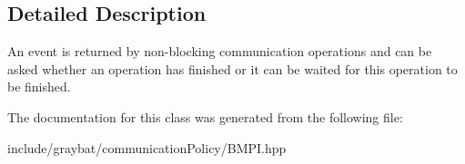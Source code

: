 \subsection{Detailed Description}
An event is returned by non-\/blocking communication operations and can be asked whether an operation has finished or it can be waited for this operation to be finished. 

The documentation for this class was generated from the following file\+:\begin{DoxyCompactItemize}
\item 
include/graybat/communication\+Policy/B\+M\+P\+I.\+hpp\end{DoxyCompactItemize}
